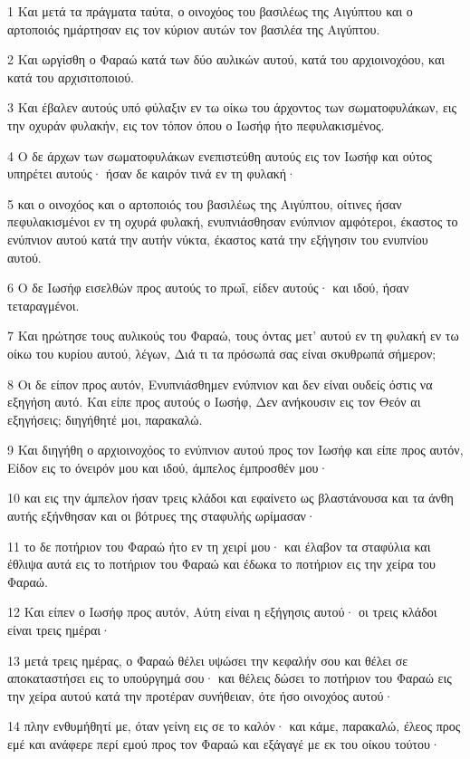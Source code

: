\par 1 Και μετά τα πράγματα ταύτα, ο οινοχόος του βασιλέως της Αιγύπτου και ο αρτοποιός ημάρτησαν εις τον κύριον αυτών τον βασιλέα της Αιγύπτου.
\par 2 Και ωργίσθη ο Φαραώ κατά των δύο αυλικών αυτού, κατά του αρχιοινοχόου, και κατά του αρχισιτοποιού.
\par 3 Και έβαλεν αυτούς υπό φύλαξιν εν τω οίκω του άρχοντος των σωματοφυλάκων, εις την οχυράν φυλακήν, εις τον τόπον όπου ο Ιωσήφ ήτο πεφυλακισμένος.
\par 4 Ο δε άρχων των σωματοφυλάκων ενεπιστεύθη αυτούς εις τον Ιωσήφ και ούτος υπηρέτει αυτούς· ήσαν δε καιρόν τινά εν τη φυλακή·
\par 5 και ο οινοχόος και ο αρτοποιός του βασιλέως της Αιγύπτου, οίτινες ήσαν πεφυλακισμένοι εν τη οχυρά φυλακή, ενυπνιάσθησαν ενύπνιον αμφότεροι, έκαστος το ενύπνιον αυτού κατά την αυτήν νύκτα, έκαστος κατά την εξήγησιν του ενυπνίου αυτού.
\par 6 Ο δε Ιωσήφ εισελθών προς αυτούς το πρωΐ, είδεν αυτούς· και ιδού, ήσαν τεταραγμένοι.
\par 7 Και ηρώτησε τους αυλικούς του Φαραώ, τους όντας μετ' αυτού εν τη φυλακή εν τω οίκω του κυρίου αυτού, λέγων, Διά τι τα πρόσωπά σας είναι σκυθρωπά σήμερον;
\par 8 Οι δε είπον προς αυτόν, Ενυπνιάσθημεν ενύπνιον και δεν είναι ουδείς όστις να εξηγήση αυτό. Και είπε προς αυτούς ο Ιωσήφ, Δεν ανήκουσιν εις τον Θεόν αι εξηγήσεις; διηγήθητέ μοι, παρακαλώ.
\par 9 Και διηγήθη ο αρχιοινοχόος το ενύπνιον αυτού προς τον Ιωσήφ και είπε προς αυτόν, Είδον εις το όνειρόν μου και ιδού, άμπελος έμπροσθέν μου·
\par 10 και εις την άμπελον ήσαν τρεις κλάδοι και εφαίνετο ως βλαστάνουσα και τα άνθη αυτής εξήνθησαν και οι βότρυες της σταφυλής ωρίμασαν·
\par 11 το δε ποτήριον του Φαραώ ήτο εν τη χειρί μου· και έλαβον τα σταφύλια και έθλιψα αυτά εις το ποτήριον του Φαραώ και έδωκα το ποτήριον εις την χείρα του Φαραώ.
\par 12 Και είπεν ο Ιωσήφ προς αυτόν, Αύτη είναι η εξήγησις αυτού· οι τρεις κλάδοι είναι τρεις ημέραι·
\par 13 μετά τρεις ημέρας, ο Φαραώ θέλει υψώσει την κεφαλήν σου και θέλει σε αποκαταστήσει εις το υπούργημά σου· και θέλεις δώσει το ποτήριον του Φαραώ εις την χείρα αυτού κατά την προτέραν συνήθειαν, ότε ήσο οινοχόος αυτού·
\par 14 πλην ενθυμήθητί με, όταν γείνη εις σε το καλόν· και κάμε, παρακαλώ, έλεος προς εμέ και ανάφερε περί εμού προς τον Φαραώ και εξάγαγέ με εκ του οίκου τούτου·

